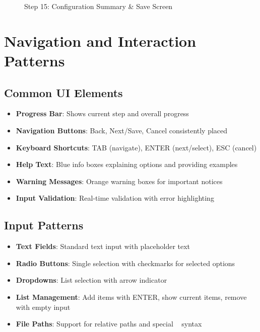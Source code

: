 \documentclass[11pt,a4paper]{article}
\begin{document}
\begin{figure}[htbp]
\caption{Step 15: Configuration Summary \& Save Screen}
\end{figure}

\section{Navigation and Interaction Patterns}

\subsection{Common UI Elements}

\begin{itemize}
    \item \textbf{Progress Bar}: Shows current step and overall progress
    \item \textbf{Navigation Buttons}: Back, Next/Save, Cancel consistently placed
    \item \textbf{Keyboard Shortcuts}: TAB (navigate), ENTER (next/select), ESC (cancel)
    \item \textbf{Help Text}: Blue info boxes explaining options and providing examples
    \item \textbf{Warning Messages}: Orange warning boxes for important notices
    \item \textbf{Input Validation}: Real-time validation with error highlighting
\end{itemize}

\subsection{Input Patterns}

\begin{itemize}
    \item \textbf{Text Fields}: Standard text input with placeholder text
    \item \textbf{Radio Buttons}: Single selection with checkmarks for selected options
    \item \textbf{Dropdowns}: List selection with arrow indicator
    \item \textbf{List Management}: Add items with ENTER, show current items, remove with empty input
    \item \textbf{File Paths}: Support for relative paths and special \texttt{~} syntax
\end{itemize}
\end{document}
